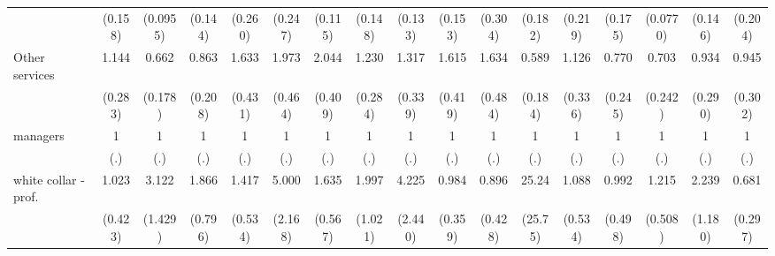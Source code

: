 {\begin{tabular}{l*{16}{c}}
                    &     (0.158)         &    (0.0955)         &     (0.144)         &     (0.260)         &     (0.247)         &     (0.115)         &     (0.148)         &     (0.133)         &     (0.153)         &     (0.304)         &     (0.182)         &     (0.219)         &     (0.175)         &    (0.0770)         &     (0.146)         &     (0.204)         \\
[1em]
Other services      &       1.144         &       0.662         &       0.863         &       1.633         &       1.973\sym{**} &       2.044\sym{***}&       1.230         &       1.317         &       1.615         &       1.634         &       0.589         &       1.126         &       0.770         &       0.703         &       0.934         &       0.945         \\
                    &     (0.283)         &     (0.178)         &     (0.208)         &     (0.431)         &     (0.464)         &     (0.409)         &     (0.284)         &     (0.339)         &     (0.419)         &     (0.484)         &     (0.184)         &     (0.336)         &     (0.245)         &     (0.242)         &     (0.290)         &     (0.302)         \\
[1em]
managers            &           1         &           1         &           1         &           1         &           1         &           1         &           1         &           1         &           1         &           1         &           1         &           1         &           1         &           1         &           1         &           1         \\
                    &         (.)         &         (.)         &         (.)         &         (.)         &         (.)         &         (.)         &         (.)         &         (.)         &         (.)         &         (.)         &         (.)         &         (.)         &         (.)         &         (.)         &         (.)         &         (.)         \\
[1em]
white collar - prof.&       1.023         &       3.122\sym{*}  &       1.866         &       1.417         &       5.000\sym{***}&       1.635         &       1.997         &       4.225\sym{*}  &       0.984         &       0.896         &       25.24\sym{**} &       1.088         &       0.992         &       1.215         &       2.239         &       0.681         \\
                    &     (0.423)         &     (1.429)         &     (0.796)         &     (0.534)         &     (2.168)         &     (0.567)         &     (1.021)         &     (2.440)         &     (0.359)         &     (0.428)         &     (25.75)         &     (0.534)         &     (0.498)         &     (0.508)         &     (1.180)         &     (0.297)         \\

\end{tabular}}
